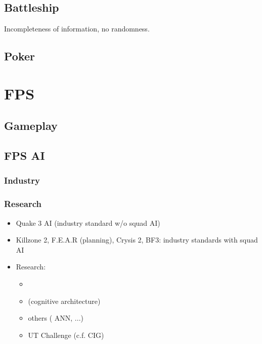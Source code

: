 \subsection{Battleship}
Incompleteness of information, no randomness.

\subsection{Poker}

\citep{gunn}

\section{FPS}
\subsection{Gameplay}
\subsection{FPS AI}
\subsubsection{Industry}
\subsubsection{Research}
\begin{itemize}
\item Quake 3 AI (industry standard w/o squad AI) \citep{waveren-02-artificial}
\item Killzone 2, F.E.A.R \citep{orkinGDC_FEAR} (planning), Crysis 2, BF3: industry standards with squad AI
\item Research:
\begin{itemize}
\item \citep{lehy04}
\item \citep{Laird01} (cognitive architecture)
\item others (\citep{Hladky_anevaluation} ANN, ...)
\item UT Challenge (c.f. CIG)
\end{itemize}
\end{itemize}
